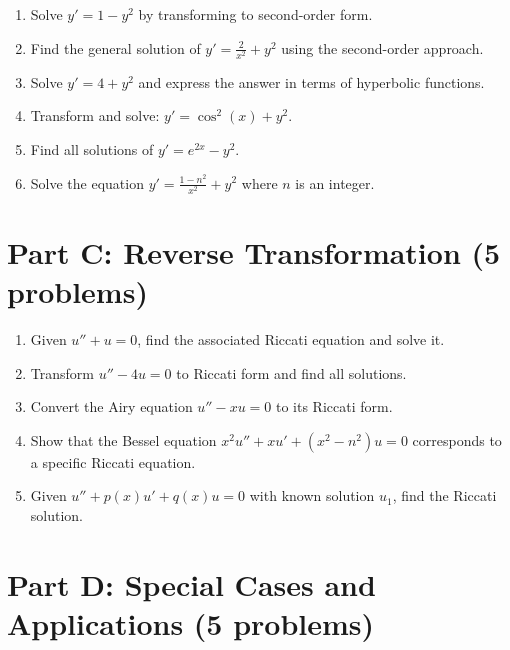 \documentclass[12pt]{article}
\begin{document}
\begin{enumerate}[resume]
    \item Solve $y' = 1 - y^2$ by transforming to second-order form.

    \item Find the general solution of $y' = \frac{2}{x^2} + y^2$ using the second-order approach.

    \item Solve $y' = 4 + y^2$ and express the answer in terms of hyperbolic functions.

    \item Transform and solve: $y' = \cos^2(x) + y^2$.

    \item Find all solutions of $y' = e^{2x} - y^2$.

    \item Solve the equation $y' = \frac{1 - n^2}{x^2} + y^2$ where $n$ is an integer.
\end{enumerate}

\section*{Part C: Reverse Transformation (5 problems)}

\begin{enumerate}[resume]
    \item Given $u'' + u = 0$, find the associated Riccati equation and solve it.

    \item Transform $u'' - 4u = 0$ to Riccati form and find all solutions.

    \item Convert the Airy equation $u'' - xu = 0$ to its Riccati form.

    \item Show that the Bessel equation $x^2u'' + xu' + (x^2 - n^2)u = 0$ corresponds to a specific Riccati equation.

    \item Given $u'' + p(x)u' + q(x)u = 0$ with known solution $u_1$, find the Riccati solution.
\end{enumerate}

\section*{Part D: Special Cases and Applications (5 problems)}
\end{document}
